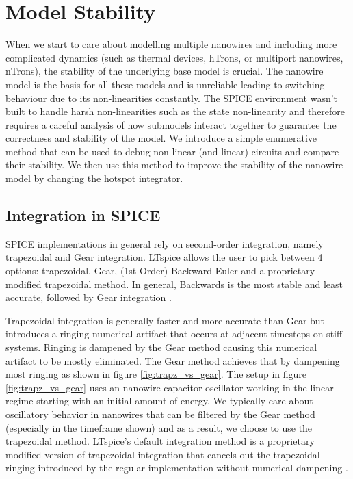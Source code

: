\section{Model Stability} \label{stability}

When we start to care about modelling multiple nanowires and including more complicated dynamics
(such as thermal devices, hTrons, or multiport nanowires, nTrons), the stability of the underlying
base model is crucial. The nanowire model is the basis for all these models and is unreliable leading
to switching behaviour due to its non-linearities constantly. The SPICE environment wasn't built to
handle harsh non-linearities such as the state non-linearity and therefore requires a careful
analysis of how submodels interact together to guarantee the correctness and stability of the model.
We introduce a simple enumerative method that can be used to debug non-linear (and linear) circuits
and compare their stability. We then use this method to improve the stability of the nanowire model
by changing the hotspot integrator.

\subsection{Integration in SPICE}

SPICE implementations in general rely on second-order integration, namely trapezoidal and Gear integration. LTspice allows the user to pick between 4 options: trapezoidal,
Gear, (1st Order) Backward Euler and a proprietary modified trapezoidal method. In general,
Backwards is the most stable and least accurate, followed by Gear integration 
\cite{ltspice-diff-post, spice-book}.

Trapezoidal integration is generally faster and more accurate than Gear but introduces a ringing
numerical artifact that occurs at adjacent timesteps on stiff systems. Ringing is dampened by the Gear
method causing this numerical artifact to be mostly eliminated. The Gear method achieves that by
dampening most ringing as shown in figure \ref{fig:trapz_vs_gear}. The setup in figure \ref{fig:trapz_vs_gear} uses an nanowire-capacitor oscillator working in the linear regime starting
with an initial amount of energy.
We typically care about oscillatory behavior in nanowires that can be filtered by the Gear
method (especially in the timeframe shown)
and as a result, we choose to use the trapezoidal method. LTspice's 
default integration method is a proprietary modified version of trapezoidal integration 
that cancels out the trapezoidal ringing introduced by the regular implementation without
numerical dampening \cite{ltspice-diff-post}. 

